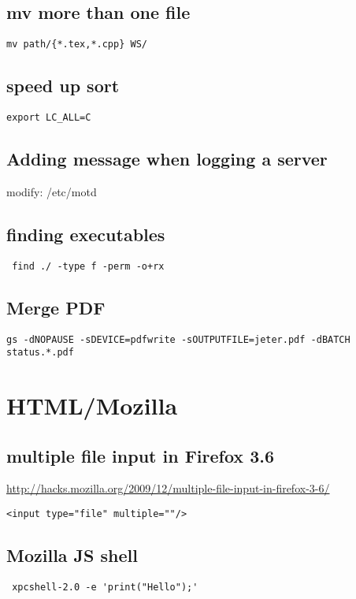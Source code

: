 \documentclass[12pt]{article}
\begin{document}
\subsection{mv more than one file}
\begin{verbatim}
mv path/{*.tex,*.cpp} WS/
\end{verbatim}

\subsection{speed up sort}
\begin{verbatim}
export LC_ALL=C
\end{verbatim}

\subsection{Adding message when logging a server}
modify: /etc/motd
\subsection{finding executables}
\begin{verbatim}
 find ./ -type f -perm -o+rx
\end{verbatim}

\subsection{Merge PDF}
\begin{verbatim}
gs -dNOPAUSE -sDEVICE=pdfwrite -sOUTPUTFILE=jeter.pdf -dBATCH status.*.pdf
\end{verbatim}

\section{HTML/Mozilla}
\subsection{multiple file input in Firefox 3.6}
\url{http://hacks.mozilla.org/2009/12/multiple-file-input-in-firefox-3-6/}
\begin{verbatim}
<input type="file" multiple=""/>
\end{verbatim}
\subsection{Mozilla JS shell}
\begin{verbatim}
 xpcshell-2.0 -e 'print("Hello");'
\end{verbatim}
\end{document}
